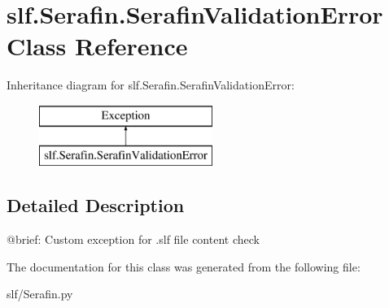 \hypertarget{classslf_1_1_serafin_1_1_serafin_validation_error}{}\section{slf.\+Serafin.\+Serafin\+Validation\+Error Class Reference}
\label{classslf_1_1_serafin_1_1_serafin_validation_error}
Inheritance diagram for slf.\+Serafin.\+Serafin\+Validation\+Error\+:\begin{figure}[H]
\begin{center}
\leavevmode
\includegraphics[height=2.000000cm]{classslf_1_1_serafin_1_1_serafin_validation_error}
\end{center}
\end{figure}


\subsection{Detailed Description}
\begin{DoxyVerb}@brief: Custom exception for .slf file content check
\end{DoxyVerb}
 

The documentation for this class was generated from the following file\+:\begin{DoxyCompactItemize}
\item 
slf/Serafin.\+py\end{DoxyCompactItemize}

